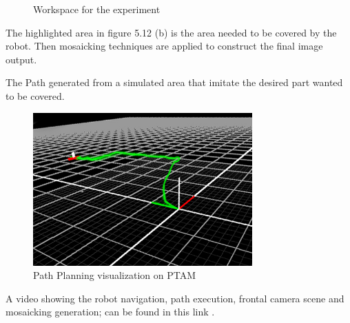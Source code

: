 \begin{figure}[H]
\label{roomy}
 
  \caption{Workspace for the experiment}
\end{figure}

The highlighted area in figure 5.12 (b) is the area needed to be covered by the robot. Then mosaicking techniques are applied to construct the final image output.

The Path generated from a simulated area that imitate the desired part wanted to be covered.


\begin{figure}[H]
 \includegraphics[width=0.75\textwidth]{figures/PTAM_Good2.jpg}
  \caption{Path Planning visualization on PTAM}
\end{figure}
A video showing the robot navigation, path execution, frontal camera scene and mosaicking generation; can be found in this link \cite{mosaic_image_intro}.  
 
